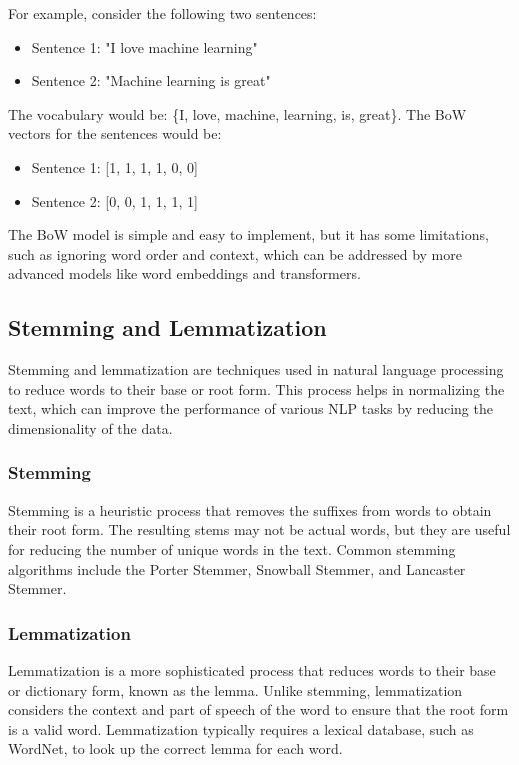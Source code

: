 \documentclass[12pt]{article}
\begin{document}
For example, consider the following two sentences:
\begin{itemize}
    \item Sentence 1: "I love machine learning"
    \item Sentence 2: "Machine learning is great"
\end{itemize}

The vocabulary would be: \{I, love, machine, learning, is, great\}. The BoW vectors for the sentences would be:
\begin{itemize}
    \item Sentence 1: [1, 1, 1, 1, 0, 0]
    \item Sentence 2: [0, 0, 1, 1, 1, 1]
\end{itemize}

The BoW model is simple and easy to implement, but it has some limitations, such as ignoring word order and context, which can be addressed by more advanced models like word embeddings and transformers.

\subsection{Stemming and Lemmatization}
Stemming and lemmatization are techniques used in natural language processing to reduce words to their base or root form. This process helps in normalizing the text, which can improve the performance of various NLP tasks by reducing the dimensionality of the data.

\subsubsection{Stemming}
Stemming is a heuristic process that removes the suffixes from words to obtain their root form. The resulting stems may not be actual words, but they are useful for reducing the number of unique words in the text. Common stemming algorithms include the Porter Stemmer, Snowball Stemmer, and Lancaster Stemmer.

\subsubsection{Lemmatization}
Lemmatization is a more sophisticated process that reduces words to their base or dictionary form, known as the lemma. Unlike stemming, lemmatization considers the context and part of speech of the word to ensure that the root form is a valid word. Lemmatization typically requires a lexical database, such as WordNet, to look up the correct lemma for each word.
\end{document}
